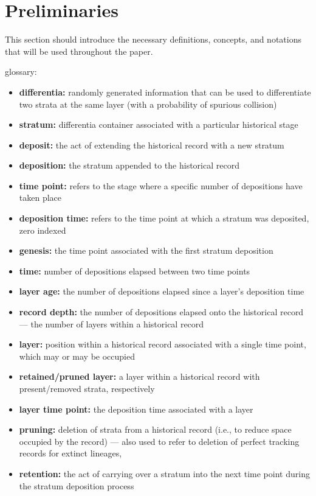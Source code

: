\section{Preliminaries} \label{sec:methods}
This section should introduce the necessary definitions, concepts, and notations that will be used throughout the paper.

glossary:
\begin{itemize}
  \item \textbf{differentia:} randomly generated information that can be used to differentiate two strata at the same layer (with a probability of spurious collision)
  \item \textbf{stratum:} differentia container associated with a particular historical stage
  \item \textbf{deposit:} the act of extending the historical record with a new stratum
  \item \textbf{deposition:} the stratum appended to the historical record
  \item \textbf{time point:} refers to the stage where a specific number of depositions have taken place
  \item \textbf{deposition time:} refers to the time point at which a stratum was deposited, zero indexed
  \item \textbf{genesis:} the time point associated with the first stratum deposition
  \item \textbf{time:} number of depositions elapsed between two time points
  \item \textbf{layer age:} the number of depositions elapsed since a layer's deposition time
  \item \textbf{record depth:} the number of depositions elapsed onto the historical record --- the number of layers within a historical record
  \item \textbf{layer:} position within a historical record associated with a single time point, which may or may be occupied
  \item \textbf{retained/pruned layer:} a layer within a historical record with present/removed strata, respectively
  \item \textbf{layer time point:} the deposition time associated with a layer
  \item \textbf{pruning:} deletion of strata from a historical record (i.e., to reduce space occupied by the record) --- also used to refer to deletion of perfect tracking records for extinct lineages,
  \item \textbf{retention:} the act of carrying over a stratum into the next time point during the stratum deposition process

\end{itemize}
